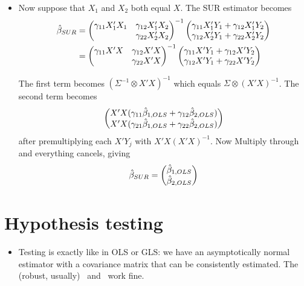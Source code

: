 \begin{itemize}[leftmargin=0pt]
\item Now suppose that $X_1$ and $X_2$ both equal $X$.
  The SUR estimator becomes
  \begin{align*}
    \hat{\beta}_{SUR}
    &= \begin{pmatrix}
      \gamma_{11} X_1'X_1 & \gamma_{12} X_1'X_2 \\ & \gamma_{22} X_2'X_2 
    \end{pmatrix}^{-1}
    \begin{pmatrix}
      \gamma_{11} X_1'Y_1 + \gamma_{12} X_1'Y_2 \\
      \gamma_{12} X_2'Y_1 + \gamma_{22} X_2'Y_2
    \end{pmatrix} \\
    &= \begin{pmatrix}
      \gamma_{11} X'X & \gamma_{12} X'X \\ & \gamma_{22}X'X
    \end{pmatrix}^{-1}
    \begin{pmatrix}
      \gamma_{11} X'Y_1 + \gamma_{12}X'Y_2 \\
      \gamma_{12} X'Y_1 + \gamma_{22} X'Y_2
    \end{pmatrix}
  \end{align*}

  The first term becomes $(\Sigma^{-1} \otimes X'X)^{-1}$ which equals
  $\Sigma \otimes (X'X)^{-1}$. The second term becomes
  \[\begin{pmatrix}
    X'X (\gamma_{11}\hat{\beta}_{1,OLS} + \gamma_{12}\hat{\beta}_{2,OLS}) \\
    X'X (\gamma_{21}\hat{\beta}_{1,OLS} + \gamma_{22}\hat{\beta}_{2,OLS})
  \end{pmatrix}\] after premultiplying each $X'Y_j$ with
  $X'X(X'X)^{-1}$. Now Multiply through and everything cancels, giving
  \begin{equation*}
    \hat{\beta}_{SUR} =
    \begin{pmatrix} \hat{\beta}_{1,OLS} \\ \hat{\beta}_{2,OLS} \end{pmatrix}
  \end{equation*}
\end{itemize}

\section{Hypothesis testing}

\begin{itemize}[leftmargin=0pt]
\item Testing is exactly like in OLS or GLS: we have an asymptotically
  normal estimator with a covariance matrix that can be consistently
  estimated.  The (robust, usually) \ttest\ and \ftest\ work fine.
\end{itemize}

